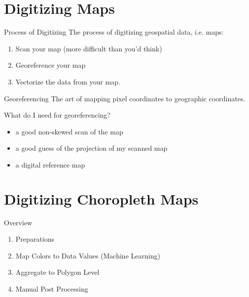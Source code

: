 \section{Digitizing Maps}

\begin{frame}{Process of Digitizing}
	\alert{The process of digitizing geospatial data, i.e. maps:}
	\begin{enumerate}
		\item Scan your map (more difficult than you'd think)
		\item Georeference your map
		\item Vectorize the data from your map.
	\end{enumerate}
\end{frame}

\begin{frame}{Georeferencing}
	\alert{The art of mapping pixel coordinates to geographic coordinates.} 
	
	\hspace{4pt}
	What do I need for georeferencing?
	
	\begin{itemize}
		\item a good non-skewed scan of the map
		\item a good guess of the projection of my scanned map
		\item a digital reference map
	\end{itemize}
\end{frame}

\section{Digitizing Choropleth Maps}
\begin{frame}{Overview}
	\begin{enumerate}
		\item Preparations
		\item Map Colors to Data Values (Machine Learning)
		\item Aggregate to Polygon Level
		\item Manual Post Processing
	\end{enumerate}
\end{frame}


